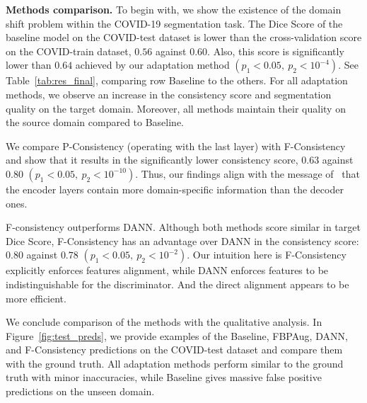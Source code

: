 \textbf{Methods comparison.} To begin with, we show the existence of the domain shift problem within the COVID-19 segmentation task. The Dice Score of the baseline model on the COVID-test dataset is lower than the cross-validation score on the COVID-train dataset, $0.56$ against $0.60$. Also, this score is significantly lower than $0.64$ achieved by our adaptation method $\left(p_1 < 0.05,\: p_2 < 10^{-4} \right)$. See Table~\ref{tab:res_final}, comparing row Baseline to the others. For all adaptation methods, we observe an increase in the consistency score and segmentation quality on the target domain. Moreover, all methods maintain their quality on the source domain compared to Baseline.




We compare P-Consistency (operating with the last layer) with F-Consistency and show that it results in the significantly lower consistency score, $0.63$ against $0.80$ $\left(p_1 < 0.05,\: p_2 < 10^{-10}\right)$. Thus, our findings align with the message of~\cite{zakazov2021anatomy} that the encoder layers contain more domain-specific information than the decoder ones.

F-consistency outperforms DANN. Although both methods score similar in target Dice Score, F-Consistency has an advantage over DANN in the consistency score: $0.80$ against $0.78$ $\left(p_1 < 0.05,\: p_2 < 10^{-2}\right)$. Our intuition here is F-Consistency explicitly enforces features alignment, while DANN enforces features to be indistinguishable for the discriminator. And the direct alignment appears to be more efficient.

We conclude comparison of the methods with the qualitative analysis. In Figure~\ref{fig:test_preds}, we provide examples of the Baseline, FBPAug, DANN, and F-Consistency predictions on the COVID-test dataset and compare them with the ground truth. All adaptation methods perform similar to the ground truth with minor inaccuracies, while Baseline gives massive false positive predictions on the unseen domain.%

